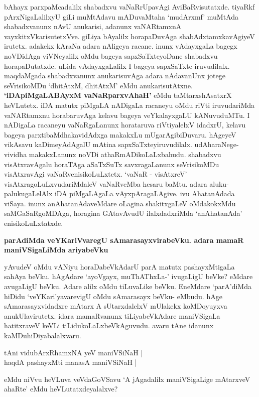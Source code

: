 \noindent
bAhayx parxpaMcadalilx shabadxvu vaNaRrUpavAgi AviBaRvisutatxde. tiyaRkf pArxNi\-gaLalilxyU giLi muMtAdavu mADuvaMtaha `mudArxmf' muMtAda shabadxvanunx nAvU anukarisi, adanunx vaNAR\-tamxnA vayxkitxVkarisutetxVve. giLiya bAyalilx horapaDuvAga shabAdxtamxkavAgiyeV irutetx. adakekx kAraNa adara nAligeya racane. inunx vAdayxgaLa bagegx noVDidAga viVNeyalilx oMdu bageya sapxSaTxteyoDane shabadxvu horapaDutatxde. uLida vAdayxgaLalilx I bageya sapxSaTxte iruvudilalx. maqdaMgada shabadxvanunx anukarisu\-vAga adara nAdavanUnx jotege seVrisikoMDu `dhitAtxM, dhitAtxM' eMdu anukarisutAtxne. {\bf `iDApiMga\-LABAyxM vaNaRparxvAhaH'}\label{204} eMdu taMtarxshAsatxrX heVLutetx. iDA matutx piMgaLA nADigaLa racaneyu oMdu riVti iruvudariMda vaNARtamxnu horabaruvAga kelavu bageya veYkalayxgaLU kANuvuduMTu. I nADigaLa racaneyu vaNaRgaLanunx horataruva riVtiyalelxV idadxrU, kelavu bageya parxtibaMdhakavidAdxga makakxLu mUgarAgibiDuvaru. hAgeyeV vikAsavu kaDimeyAdAgalU mAtina sapxSaTxteyiruvudilalx. udAhara\-Nege- vividha makakxLanunx noVDi athaRmADikoLaLxbahudu. shabadxvu visAtxravAgalu horaTAga aSaTxSuTx\- savxragaLanunx seVrisikoMDu visAtxravAgi vaNaRvenisikoLuLxtetx. `vaNaR - visAtxreV' visAtxragoLuLxvudariM\-daleV vaNaRveMba hesaru baMtu. adara aluku-palukugaLelAlx iDA piMgaLAgaLa vAyxpAragaLAgive. ivu AhatanAdada viSaya. inunx anAhatanAdaveMdare oLagina shakitxgaLeV oMdakokxMdu saMGaSaRgoMDAga, horagina GAtavAvudU ilalxdadxriMda `anAhatanAda' enisikoLuLxtatxde.

{\bigskip
\noindent
{\large\bf parAdiMda veYKariVvaregU sAmarasayxvirabeVku. adara mamaR maniVSi\-gaLiMda ariyabeVku}}\label{page204}
\medskip

\noindent
yAvudeV oMdu vANiyu horaDabeVkAdarU parA matutx pashayxMtigaLa sahAya beVku. hAgA\-dare `ayoVgayx, muThAThxLa-' ivugaLigU beVke? eMdare avugaLigU beVku. Adare alilx oMdu tiLu\-vaLike beVku. EneMdare `parA'diMda hiDidu `veYKari'yavarevigU oMdu sAmarasayx beVku- eMbudu. hAge sAmarasayxvidadxre mAtarx A sUtarxdalelxV mUlakekx koMDoyuyxva anukUlavirutetx. idara mamaR\-vanunx tiLiyabeVkAdare maniVSigaLa hatitxraveV keVLi tiLidukoLaLxbeVkAguvudu. avaru tAne idanunx kaMDu\-hiDiyabalalxvaru.

\begin{shloka}
tAni vidubArxRhamxNA yeV maniVSiNaH |\\\label{205}
haqdA pashayxMti manasA maniVSiNaH |\label{205}
\end{shloka}

\noindent
eMdu niVvu heVLuva veVdaGoVSavu `A jAgadalilx maniVSigaLige mAtarxveV ahaRte' eMdu heVLu\-tatxdeyalalxve?

